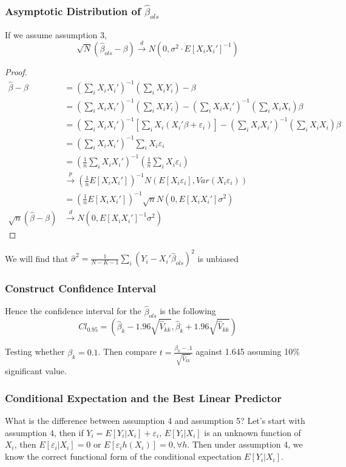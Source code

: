 \documentclass[11pt, a4paper, oneside]{article}
\theoremstyle{definition}
\theoremstyle{proposition}
\theoremstyle{corollary}
\theoremstyle{lemma}
\theoremstyle{theorem}
\begin{document}
\subsubsection{Asymptotic Distribution of $\hat{\beta}_{ols}$} 
If we assume assumption 3, $$\sqrt{N}(\hat{\beta}_{ols} - \beta) \overset{d}{\to} N(0 ,\sigma^2\cdot E[X_iX_i']^{-1})$$
\begin{proof}
\begin{align*}
\hat{\beta} - \beta & = (\sum_i X_iX_i')^{-1}(\sum_i X_iY_i) - \beta\\
&=(\sum_i X_iX_i')^{-1}(\sum_i X_iY_i) - (\sum_i X_iX_i')^{-1}(\sum_i X_iX_i)\beta \\
&=(\sum_i X_iX_i')^{-1}[\sum_i X_i (X_i'\beta+\varepsilon_i)]- (\sum_i X_iX_i')^{-1}(\sum_i X_iX_i)\beta \\
&= (\sum_i X_iX_i')^{-1}\sum_i X_i \varepsilon_i \\
&=(\frac{1}{n}\sum_i X_iX_i')^{-1}(\frac{1}{n}\sum_i X_i \varepsilon_i)\\
&\overset{p}{\to} (\frac{1}{n}E[X_iX_i'])^{-1} N(E[X_i\varepsilon_i], Var(X_i\varepsilon_i)) \\
&= (\frac{1}{n}E[X_iX_i'])^{-1} \sqrt{n}N(0, E[X_iX_i']\sigma^2)\\
\sqrt{n}(\hat{\beta} -\beta) &\overset{d}{\to} N(0, E[X_iX_i']^{-1}\sigma^2)
\end{align*}
\end{proof}

We will find that $\hat{\sigma}^2 = \frac{1}{N-K-1}\sum_i (Y_i -X_i'\hat{\beta}_{ols})^2$ is unbiased

\subsubsection{Construct Confidence Interval}
Hence the confidence interval for the $\hat{\beta}_{ols}$ is the following
$$Cl_{0.95} = (\hat{\beta}_k -1.96\sqrt{\hat{V}_{kk}}, \hat{\beta}_k + 1.96 \sqrt{\hat{V}_{kk}})$$

Testing whether $\beta_k = 0.1$. Then compare $t = \frac{\beta_k -.1}{\sqrt{\hat{V}_{kk}}}$ against 1.645 assuming 10\% significant value. 

\subsubsection{Conditional Expectation and the Best Linear Predictor}
What is the difference between assumption 4 and assumption 5? Let's start with assumption 4, then if $Y_i = E[Y_i | X_i] +\varepsilon_i$, $E[Y_i|X_i]$ is an unknown function of $X_i$, then $E[\varepsilon_i|X_i] = 0$ or $E[\varepsilon_ih(X_i)] = 0, \forall h$. Then under assumption 4, we know the correct functional form of the conditional expectation $E[Y_i|X_i]$. 
\end{document}
